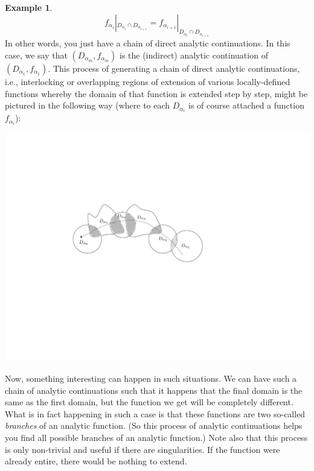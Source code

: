 \documentclass[a4paper]{book}
\theoremstyle{definition}
\newtheorem{example}{Example}[section]
\theoremstyle{definition}
\theoremstyle{definition}
\theoremstyle{theorem}
\theoremstyle{definition}
\begin{document}
\begin{example}
	\begin{equation*}
	f_{\alpha_i}|_{D_{\alpha_i} \cap D_{\alpha_{i+1}}} = f_{\alpha_{i+1}}|_{D_{\alpha_i} \cap D_{\alpha_{i+1}}}
	\end{equation*}
	In other words, you just have a chain of direct analytic continuations. In this case, we say that $(D_{\alpha_m}, f_{\alpha_m})$ is the (indirect) analytic continuation of $(D_{\alpha_1}, f_{\alpha_1})$. This process of generating a chain of direct analytic continuations, i.e., interlocking or overlapping regions of extension of various locally-defined functions whereby the domain of that function is extended step by step, might be pictured in the following way (where to each $D_{\alpha_i}$ is of course attached a function $f_{\alpha_i}$): 
	\begin{center}
		\hspace*{-1cm}
		\includegraphics[scale=0.6]{AnalyticContination.png}
		\vspace*{-6cm}
	\end{center}
	Now, something interesting can happen in such situations. We can have such a chain of analytic continuations such that it happens that the final domain is the same as the first domain, but the function we get will be completely different. What is in fact happening in such a case is that these functions are two so-called \textit{branches} of an analytic function. (So this process of analytic continuations helps you find all possible branches of an analytic function.) Note also that this process is only non-trivial and useful if there are singularities. If the function were already entire, there would be nothing to extend. \par 

\end{example}
\end{document}
